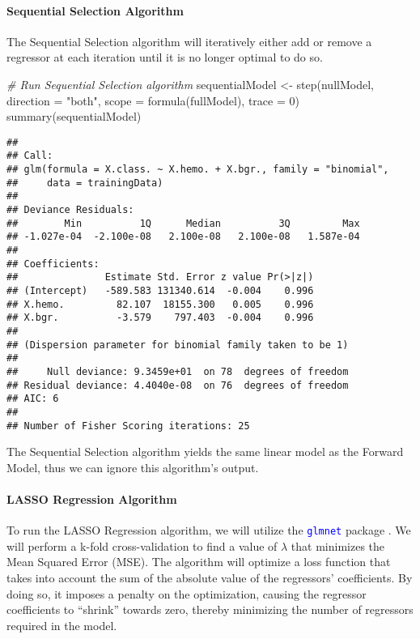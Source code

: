 \documentclass[
]{article}
\newenvironment{Shaded}{\begin{snugshade}}{\end{snugshade}}
\newcommand{\AttributeTok}[1]{\textcolor[rgb]{0.77,0.63,0.00}{#1}}
\newcommand{\CommentTok}[1]{\textcolor[rgb]{0.56,0.35,0.01}{\textit{#1}}}
\newcommand{\DecValTok}[1]{\textcolor[rgb]{0.00,0.00,0.81}{#1}}
\newcommand{\FunctionTok}[1]{\textcolor[rgb]{0.00,0.00,0.00}{#1}}
\newcommand{\NormalTok}[1]{#1}
\newcommand{\OtherTok}[1]{\textcolor[rgb]{0.56,0.35,0.01}{#1}}
\newcommand{\StringTok}[1]{\textcolor[rgb]{0.31,0.60,0.02}{#1}}
\begin{document}
\hypertarget{sequential-selection-algorithm}{%
\paragraph{Sequential Selection
Algorithm}\label{sequential-selection-algorithm}}

The Sequential Selection algorithm will iteratively either add or remove
a regressor at each iteration until it is no longer optimal to do so.

\begin{Shaded}
\begin{Highlighting}[]
\CommentTok{\# Run Sequential Selection algorithm}
\NormalTok{sequentialModel }\OtherTok{\textless{}{-}} \FunctionTok{step}\NormalTok{(nullModel, }\AttributeTok{direction =} \StringTok{"both"}\NormalTok{, }
    \AttributeTok{scope =} \FunctionTok{formula}\NormalTok{(fullModel), }\AttributeTok{trace =} \DecValTok{0}\NormalTok{)}
\FunctionTok{summary}\NormalTok{(sequentialModel)}
\end{Highlighting}
\end{Shaded}

\begin{verbatim}
## 
## Call:
## glm(formula = X.class. ~ X.hemo. + X.bgr., family = "binomial", 
##     data = trainingData)
## 
## Deviance Residuals: 
##        Min          1Q      Median          3Q         Max  
## -1.027e-04  -2.100e-08   2.100e-08   2.100e-08   1.587e-04  
## 
## Coefficients:
##               Estimate Std. Error z value Pr(>|z|)
## (Intercept)   -589.583 131340.614  -0.004    0.996
## X.hemo.         82.107  18155.300   0.005    0.996
## X.bgr.          -3.579    797.403  -0.004    0.996
## 
## (Dispersion parameter for binomial family taken to be 1)
## 
##     Null deviance: 9.3459e+01  on 78  degrees of freedom
## Residual deviance: 4.4040e-08  on 76  degrees of freedom
## AIC: 6
## 
## Number of Fisher Scoring iterations: 25
\end{verbatim}

The Sequential Selection algorithm yields the same linear model as the
Forward Model, thus we can ignore this algorithm's output.

\hypertarget{lasso-regression-algorithm}{%
\paragraph{LASSO Regression
Algorithm}\label{lasso-regression-algorithm}}

To run the LASSO Regression algorithm, we will utilize the
\textcolor{blue}{\texttt{glmnet}} package \autocite{Friedman2010}. We
will perform a k-fold cross-validation to find a value of \(\lambda\)
that minimizes the Mean Squared Error (MSE). The algorithm will optimize
a loss function that takes into account the sum of the absolute value of
the regressors' coefficients. By doing so, it imposes a penalty on the
optimization, causing the regressor coefficients to ``shrink'' towards
zero, thereby minimizing the number of regressors required in the model.
\end{document}
